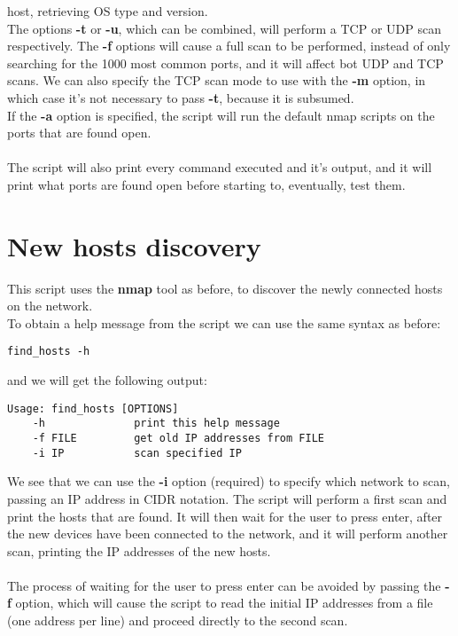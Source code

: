 host, retrieving OS type and version.\\
The options \textbf{-t} or \textbf{-u}, which can be combined,
will perform a TCP or UDP scan respectively. The \textbf{-f} options will cause a full
scan to be performed, instead of only searching for the 1000 most common ports,
and it will affect bot UDP and TCP scans.
We can also specify the TCP scan mode to use with the \textbf{-m} option, in which
case it's not necessary to pass \textbf{-t}, because it is subsumed.\\
If the \textbf{-a} option is specified, the script will run the default nmap scripts
on the ports that are found open.\\\\
The script will also print every command executed and it's output, and it will
print what ports are found open before starting to, eventually, test them.
\section{New hosts discovery}
This script uses the \textbf{nmap} tool as before, to discover the newly connected
hosts on the network.\\
To obtain a help message from the script we can use the same syntax as before:
\begin{lstlisting}[numbers=none]
    find_hosts -h
\end{lstlisting}
and we will get the following output:
\begin{lstlisting}[numbers=none]
    Usage: find_hosts [OPTIONS]
    -h              print this help message
    -f FILE         get old IP addresses from FILE
    -i IP           scan specified IP
\end{lstlisting}
We see that we can use the \textbf{-i} option (required) to specify which network to scan,
passing an IP address in CIDR notation. The script will perform a first scan and
print the hosts that are found. It will then wait for the user to press enter,
after the new devices have been connected to the network, and it will perform
another scan, printing the IP addresses of the new hosts.\\\\
The process of waiting for the user to press enter can be avoided by passing
the \textbf{-f} option, which will cause the script to read the initial IP addresses
from a file (one address per line) and proceed directly to the second scan.
